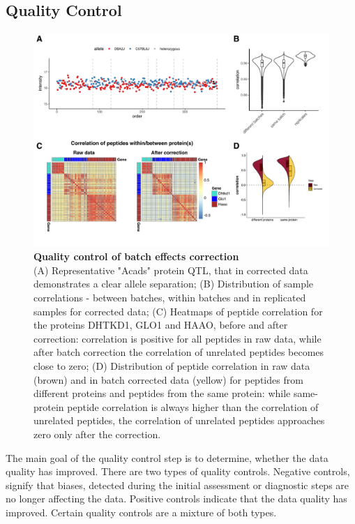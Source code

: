 \documentclass[num-refs]{wiley-article}
\begin{document}
\subsection{Quality Control}
\begin{figure}[hbt]
	\includegraphics[width=\textwidth]{figures/Fig5_quality_control2.pdf}
	
	\caption{\textbf{Quality control of batch effects correction}  \\
		\footnotesize
		(A) Representative "Acads" protein QTL, that in corrected data demonstrates a clear allele separation; (B) Distribution of sample correlations - between batches, within batches and in replicated samples for corrected data; (C)  Heatmaps of peptide correlation for the proteins DHTKD1, GLO1 and HAAO, before and after correction: correlation is positive for all peptides in raw data, while after batch correction the correlation of unrelated peptides becomes close to zero; (D) Distribution of peptide correlation in raw data (brown) and in batch corrected data (yellow) for peptides from different proteins and peptides from the same protein: while same-protein peptide correlation is always higher than the correlation of unrelated peptides, the correlation of unrelated peptides approaches zero only after the correction.}
	\label{fig:batch_fig6_QualityControl}
\end{figure}


The main goal of the quality control step is to determine, whether the data quality has improved. There are two types of quality controls. Negative controls, signify that biases, detected during the initial assessment or diagnostic steps are no longer affecting the data. Positive controls indicate that the data quality has improved. Certain quality controls are a mixture of both types.
\end{document}
